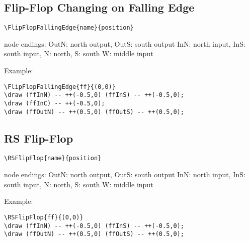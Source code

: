 \documentclass[parskip=full]{scrartcl}
\begin{document}
\subsection{Flip-Flop Changing on Falling Edge}

\begin{verbatim}
\FlipFlopFallingEdge{name}{position}
\end{verbatim}
node endings: OutN: north output, OutS: south output
              InN: north input, InS: south input,
              N: north, S: south
              W: middle input

Example:\\
\begin{minipage}{0.8\textwidth}
\begin{verbatim}
\FlipFlopFallingEdge{ff}{(0,0)}
\draw (ffInN) -- ++(-0.5,0) (ffInS) -- ++(-0.5,0);
\draw (ffInC) -- ++(-0.5,0);
\draw (ffOutN) -- ++(0.5,0) (ffOutS) -- ++(0.5,0);
\end{verbatim}
\end{minipage}
\begin{minipage}{0.19\textwidth}
\end{minipage}

\subsection{RS Flip-Flop}

\begin{verbatim}
\RSFlipFlop{name}{position}
\end{verbatim}
node endings: OutN: north output, OutS: south output
              InN: north input, InS: south input,
              N: north, S: south
              W: middle input

Example:\\
\begin{minipage}{0.8\textwidth}
\begin{verbatim}
\RSFlipFlop{ff}{(0,0)}
\draw (ffInN) -- ++(-0.5,0) (ffInS) -- ++(-0.5,0);
\draw (ffOutN) -- ++(0.5,0) (ffOutS) -- ++(0.5,0);
\end{verbatim}
\end{minipage}
\begin{minipage}{0.19\textwidth}
\end{minipage}
\end{document}
